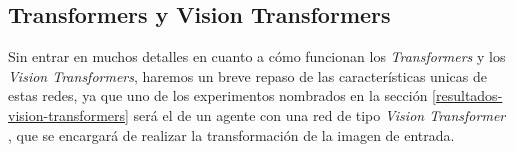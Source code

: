 \subsection{Transformers y Vision Transformers}
\label{vision-transformers}

Sin entrar en muchos detalles en cuanto a cómo funcionan los \textit{Transformers} y los \textit{Vision Transformers}, haremos un breve repaso de las características unicas de estas redes, ya que uno de los experimentos nombrados en la sección \ref{resultados-vision-transformers} será el de un agente con una red de tipo \textit{Vision Transformer} \citep{visiontransformers}, que se encargará de realizar la transformación de la imagen de entrada.
\medskip

\begin{figure}[H]
  \centering

\end{figure}
